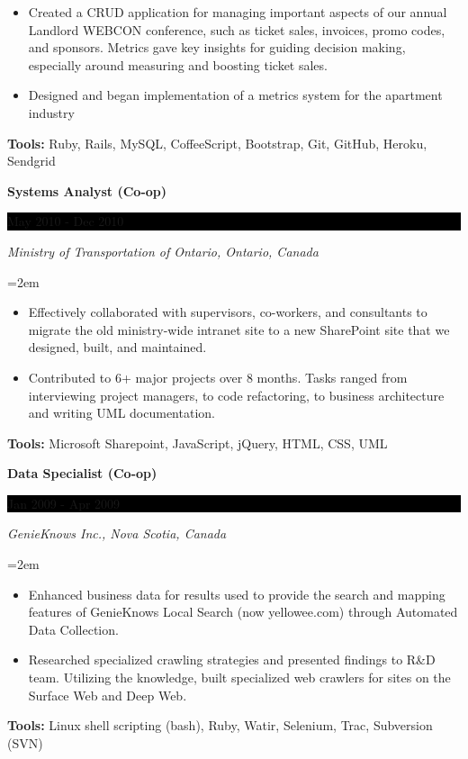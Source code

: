 \documentclass[paper=a4,fontsize=11pt]{scrartcl} %
\newcommand{\sepspace}{\vspace*{1em}}   %
\newcommand{\EducationEntry}[4]{
    \noindent \textbf{#1} \hfill      %
    \colorbox{Black}{
      \parbox{8.5em}{
      \hfill\color{White}#2}} \par  %
    \noindent \textit{#3} \par        %
    \noindent\hangindent=2em\hangafter=0 \small #4 %
    \normalsize \par}
\newcommand{\WorkEntry}[4]{       %
    \noindent \textbf{#1} \hfill      %
    \colorbox{Black}{%
      \parbox{9em}{%
      \hfill\color{White}#2}} \par   %
        \noindent \textit{#3} \par        %
    \noindent\hangindent=2em\hangafter=0 \small #4 %
    \normalsize \par}
\begin{document}
{\begin{itemize}
   \item Created a CRUD application for managing important aspects of our annual Landlord WEBCON conference, such as ticket sales, invoices, promo codes, and sponsors. Metrics gave key insights for guiding decision making, especially around measuring and boosting ticket sales.
   \item Designed and began implementation of a metrics system for the apartment industry
 \end{itemize}
 \textbf{Tools:} Ruby, Rails, MySQL, CoffeeScript, Bootstrap, Git, GitHub, Heroku, Sendgrid
}
\sepspace

\WorkEntry{Systems Analyst (Co-op)}{May 2010 - Dec 2010}
{Ministry of Transportation of Ontario, Ontario, Canada}
{
 \begin{itemize} \itemsep -1pt
   \item Effectively collaborated with supervisors, co-workers, and
   consultants to migrate the old ministry-wide intranet site to a new
   SharePoint site that we designed, built, and maintained.
   \item Contributed to 6+ major projects over 8 months.
   Tasks ranged from interviewing project managers, to code refactoring,
   to business architecture and writing UML documentation.
 \end{itemize}
 \textbf{Tools:} Microsoft Sharepoint, JavaScript, jQuery, HTML, CSS, UML
} %
\sepspace

\WorkEntry{Data Specialist (Co-op)}{Jan 2009 - Apr 2009}
{GenieKnows Inc., Nova Scotia, Canada}
{
 \begin{itemize} \itemsep -1pt
   \item Enhanced business data for results used to provide the search
   and mapping features of GenieKnows Local Search (now yellowee.com)
   through Automated Data Collection.
   \item Researched specialized crawling strategies and presented findings
   to R\&D team. Utilizing the knowledge, built specialized web crawlers
   for sites on the Surface Web and Deep Web.
 \end{itemize}
 \textbf{Tools:} Linux shell scripting (bash), Ruby, Watir, Selenium, Trac, Subversion (SVN)
}
\end{document}
